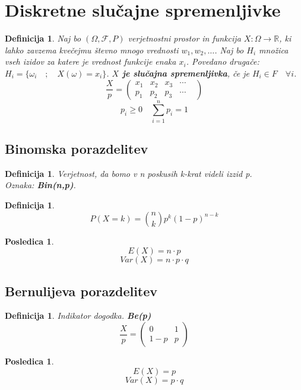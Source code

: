 \documentclass[11pt]{article}
\newtheorem{Posledica}[Izrek]{{\sc Posledica}}
\newtheorem{Definicija}[Izrek]{{\sc Definicija}}
\begin{document}
	\section{Diskretne slučajne spremenljivke}
	\begin{Definicija}
		Naj bo $(\Omega, \mathcal{F}, P) $ verjetnostni prostor in funkcija $X: \Omega \to \mathbb{R}$, ki lahko zavzema kvečejmu števno mnogo vrednosti $w_1, w_2,\dots $. Naj bo $H_i$ množica vseh izidov za katere je vrednost funkcije enaka $x_i$. Povedano drugače:
		$H_i = \{ \omega_i \quad;\quad X(\omega) = x_i\}$. \textbf{$X$ je slučajna spremenljivka}, če je $H_i \in F \quad \forall i$.
		\\
		\[
		\frac{X}{p} = \begin{pmatrix}
		x_1 & x_2 & x_3 & \cdots & \\       p_1 & p_2 & p_3 & \cdots & 
		\end{pmatrix}
		\]
		$$p_i \ge 0 \quad \sum_{i=1}^{n}{p_i} = 1$$
	\end{Definicija}
	
	\subsection{Binomska porazdelitev}
	\begin{Definicija}
		Verjetnost, da bomo v n poskusih k-krat videli izzid p.
		\\
		Oznaka: \textbf{Bin(n,p)}.
	\end{Definicija}
	\begin{Definicija}
		$$P(X=k) = \binom{n}{k} p^k (1-p)^{n-k}$$
	\end{Definicija}
	\begin{Posledica}
		$$E(X) = n\cdot p$$
		$$Var(X) = n\cdot p\cdot q$$
	\end{Posledica}
	\subsection{Bernulijeva porazdelitev}
	\begin{Definicija}
		Indikator dogodka. \textbf{Be(p)}
		\[
		\frac{X}{p} = \begin{pmatrix}
		0 & 1 \\       1-p & p  
		\end{pmatrix}
		\]
	\end{Definicija}
	\begin{Posledica}
		$$E(X) = p$$
		$$Var(X) = p\cdot q$$
	\end{Posledica}
\end{document}
